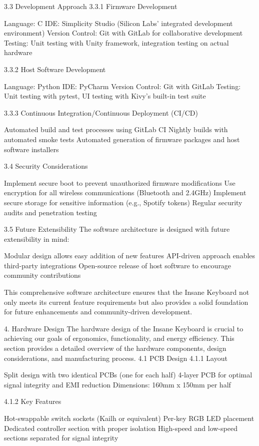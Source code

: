 \documentclass[a4paper,11pt]{article}%
\begin{document}
3.3 Development Approach
3.3.1 Firmware Development

Language: C
IDE: Simplicity Studio (Silicon Labs' integrated development environment)
Version Control: Git with GitLab for collaborative development
Testing: Unit testing with Unity framework, integration testing on actual hardware

3.3.2 Host Software Development

Language: Python
IDE: PyCharm
Version Control: Git with GitLab
Testing: Unit testing with pytest, UI testing with Kivy's built-in test suite

3.3.3 Continuous Integration/Continuous Deployment (CI/CD)

Automated build and test processes using GitLab CI
Nightly builds with automated smoke tests
Automated generation of firmware packages and host software installers

3.4 Security Considerations

Implement secure boot to prevent unauthorized firmware modifications
Use encryption for all wireless communications (Bluetooth and 2.4GHz)
Implement secure storage for sensitive information (e.g., Spotify tokens)
Regular security audits and penetration testing

3.5 Future Extensibility
The software architecture is designed with future extensibility in mind:

Modular design allows easy addition of new features
API-driven approach enables third-party integrations
Open-source release of host software to encourage community contributions

This comprehensive software architecture ensures that the Insane Keyboard not only meets its current feature requirements but also provides a solid foundation for future enhancements and community-driven development.


4. Hardware Design
The hardware design of the Insane Keyboard is crucial to achieving our goals of ergonomics, functionality, and energy efficiency. This section provides a detailed overview of the hardware components, design considerations, and manufacturing process.
4.1 PCB Design
4.1.1 Layout

Split design with two identical PCBs (one for each half)
4-layer PCB for optimal signal integrity and EMI reduction
Dimensions: 160mm x 150mm per half

4.1.2 Key Features

Hot-swappable switch sockets (Kailh or equivalent)
Per-key RGB LED placement
Dedicated controller section with proper isolation
High-speed and low-speed sections separated for signal integrity
\end{document}

